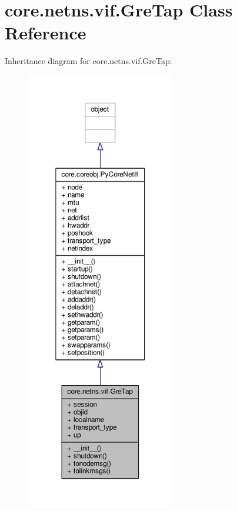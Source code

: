 \hypertarget{classcore_1_1netns_1_1vif_1_1_gre_tap}{\section{core.\+netns.\+vif.\+Gre\+Tap Class Reference}
\label{classcore_1_1netns_1_1vif_1_1_gre_tap}
}


Inheritance diagram for core.\+netns.\+vif.\+Gre\+Tap\+:
\nopagebreak
\begin{figure}[H]
\begin{center}
\leavevmode
\includegraphics[height=550pt]{classcore_1_1netns_1_1vif_1_1_gre_tap__inherit__graph}
\end{center}
\end{figure}


